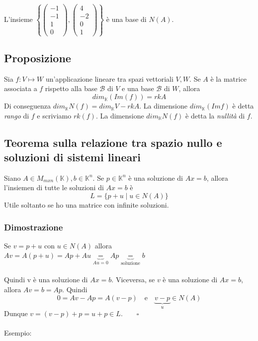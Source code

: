\documentclass[12pt]{article}
\begin{document}
L'insieme $\left\{\begin{pmatrix}
    -1\\
    -1\\
    1\\
    0
\end{pmatrix}, \begin{pmatrix}
    4\\
    -2\\
    0\\
    1
\end{pmatrix}\right\}$ è una base di $N(A)$.

\subsection{Proposizione}

Sia $f: V \mapsto W$ un'applicazione lineare tra spazi vettoriali $V, W$. Se $A$ è la matrice associata a $f$ rispetto alla base $\mathcal{B}$ di $V$ e una base $\mathcal{B}$ di $W$, allora
\[dim_{\mathbb{K}}(Im(f)) = rkA\]
Di conseguenza $dim_{\mathbb{K}}N(f) = dim_{\mathbb{K}}V - rkA$. La dimensione $dim_{\mathbb{K}}(Imf)$ è detta \textit{rango} di $f$ e scriviamo $rk(f)$. La dimensione $dim_{\mathbb{K}}N(f)$ è detta la \textit{nullità} di $f$.


\subsection{Teorema sulla relazione tra spazio nullo e soluzioni di sistemi lineari}

Siano $A \in M_{mxn}(\mathbb{K}), b \in \mathbb{K}^n$. Se $p \in \mathbb{K}^n$ è una soluzione di $Ax = b$, allora l'insiemen di tutte le soluzioni di $Ax = b$ è
\[L = \{p + u \mid u \in N(A)\}\]
Utile soltanto se ho una matrice con infinite soluzioni.

\subsubsection{Dimostrazione}
Se $v = p + u$ con $u \in N(A)$ allora $Av = A(p+u) = Ap + Au \underbrace{=}_{Au = 0} Ap \underbrace{=}_{\text{soluzione}} b$ \\\\
Quindi v è una soluzione di $Ax = b$.
Viceversa, se $v$ è una soluzione di $Ax = b$, allora $Av = b = Ap$. Quindi
\[0 = Av - Ap = A(v-p) \quad \text{e} \quad \underbrace{v-p}_{u} \in N(A)\]
Dunque $v = (v-p) + p = u + p \in L. \quad \quad \square$
\\\\
Esempio:
\end{document}
